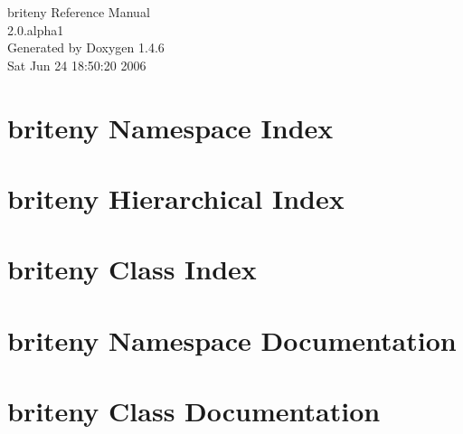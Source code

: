\documentclass[a4paper]{book}
\begin{document}
\begin{titlepage}
\vspace*{7cm}
\begin{center}
{\Large briteny Reference Manual\\[1ex]\large 2.0.alpha1 }\\
\vspace*{1cm}
{\large Generated by Doxygen 1.4.6}\\
\vspace*{0.5cm}
{\small Sat Jun 24 18:50:20 2006}\\
\end{center}
\end{titlepage}
\clearemptydoublepage
{}
\tableofcontents
\clearemptydoublepage
{}
\chapter{briteny Namespace Index}

\chapter{briteny Hierarchical Index}

\chapter{briteny Class Index}

\chapter{briteny Namespace Documentation}


\chapter{briteny Class Documentation}


\printindex
\end{document}
